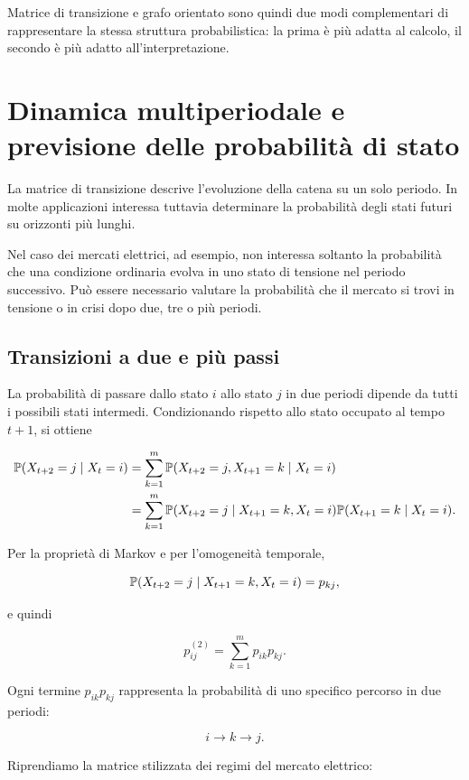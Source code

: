 Matrice di transizione e grafo orientato sono quindi due modi
complementari di rappresentare la stessa struttura probabilistica: la
prima \`{e} pi\`{u} adatta al calcolo, il secondo \`{e} pi\`{u} adatto
all'interpretazione.

\section{Dinamica multiperiodale e previsione delle probabilit\`{a} di stato}

La matrice di transizione descrive l'evoluzione della catena su un solo
periodo. In molte applicazioni interessa tuttavia determinare la
probabilit\`{a} degli stati futuri su orizzonti pi\`{u} lunghi.

Nel caso dei mercati elettrici, ad esempio, non interessa soltanto la
probabilit\`{a} che una condizione ordinaria evolva in uno stato di
tensione nel periodo successivo. Pu\`{o} essere necessario valutare la
probabilit\`{a} che il mercato si trovi in tensione o in crisi dopo due,
tre o pi\`{u} periodi.

\subsection{Transizioni a due e pi\`{u} passi}

La probabilit\`{a} di passare dallo stato \(i\) allo stato \(j\) in due
periodi dipende da tutti i possibili stati intermedi. Condizionando
rispetto allo stato occupato al tempo \(t+1\), si ottiene

\[
\begin{split}
\mathbb{P}(X_{t+2}=j\mid X_t=i)
&=
\sum_{k=1}^{m}
\mathbb{P}(X_{t+2}=j,X_{t+1}=k\mid X_t=i)
\\
&=
\sum_{k=1}^{m}
\mathbb{P}(X_{t+2}=j\mid X_{t+1}=k,X_t=i)
\mathbb{P}(X_{t+1}=k\mid X_t=i).
\end{split}
\]

Per la propriet\`{a} di Markov e per l'omogeneit\`{a} temporale,

\[
\mathbb{P}(X_{t+2}=j\mid X_{t+1}=k,X_t=i)=p_{kj},
\]

e quindi

\[
p_{ij}^{(2)}
=
\sum_{k=1}^{m}p_{ik}p_{kj}.
\]

Ogni termine \(p_{ik}p_{kj}\) rappresenta la probabilit\`{a} di uno
specifico percorso in due periodi:

\[
i\longrightarrow k\longrightarrow j.
\]

Riprendiamo la matrice stilizzata dei regimi del mercato elettrico:


